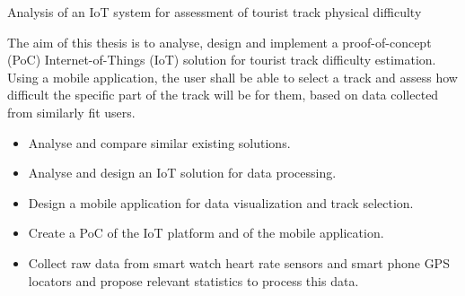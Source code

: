 \linebreak
Analysis of an IoT system for assessment of tourist track physical difficulty

The aim of this thesis is to analyse, design and implement a proof-of-concept  (PoC) Internet-of-Things (IoT) solution for tourist track difficulty estimation.
Using a mobile application, the user shall be able to select a track and assess how difficult the specific part of the track will be for them, based on data collected from similarly fit users.
\begin{itemize}
    \item Analyse and compare similar existing solutions.
    \item Analyse and design an IoT solution for data processing.
    \item Design a mobile application for data visualization and track selection.
    \item Create a PoC of the IoT platform and of the mobile application.
    \item Collect raw data from smart watch heart rate sensors and smart phone GPS locators and propose relevant statistics to process this data.
\end{itemize}
